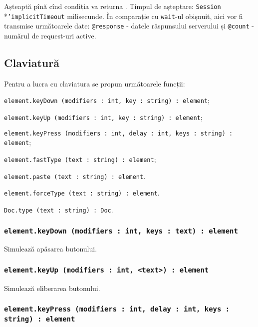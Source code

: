 Așteaptă pînă cînd condiția va returna \true. Timpul de așteptare: \texttt{Session}\\*\texttt{'implicitTimeout} milisecunde. În comparație cu \texttt{wait}-ul obișnuit, aici vor fi transmise următoarele date: \texttt{@response} - datele răspunsului serverului și \texttt{@count} - numărul de request-uri active.

\subsection{Claviatură}

Pentru a lucra cu claviatura se propun următoarele funcții:
\begin{icItems}
	\item \texttt{element.keyDown (modifiers : int, key : string) : element};
	\item \texttt{element.keyUp (modifiers : int, key : string) : element};
	\item \texttt{element.keyPress (modifiers : int, delay : int, keys : string) : element};
	\item \texttt{element.fastType (text : string) : element};
	\item \texttt{element.paste (text : string) : element}.
	\item \texttt{element.forceType (text : string) : element}.
	\item \texttt{Doc.type (text : string) : Doc}.
\end{icItems}

\subsubsection{\texttt{element.keyDown (modifiers : int, keys : text) : element}}

Simulează apăsarea butonului.

\subsubsection{\texttt{element.keyUp (modifiers : int, <text>) : element}}

Simulează eliberarea butonului.

\subsubsection{\texttt{element.keyPress (modifiers : int, delay : int, keys : string) : element}}


